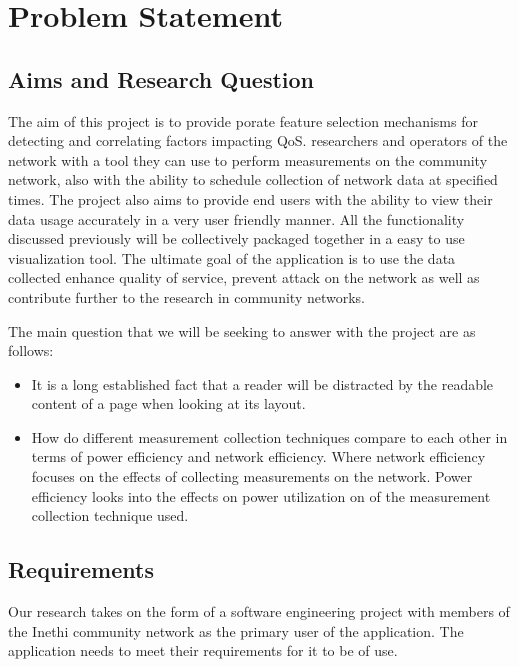 \section{Problem Statement}
\subsection{Aims and Research Question}
The aim of this project is to provide porate feature selection mechanisms for detecting and correlating factors impacting QoS.
researchers and operators of the network with a tool they can use to perform measurements on the community network, also with the ability to schedule collection of network data at specified times. The project also aims to provide end users with the ability to view their data usage accurately in a very user friendly manner. All the functionality discussed previously will be collectively packaged together in a easy to use visualization tool. The ultimate goal of the application is to use the data collected enhance quality of service, prevent attack on the network as well as contribute further to the research in community networks.

The main question that we will be seeking to answer with the project are as follows:
\begin{itemize}
	\item It is a long established fact that a reader will be distracted by the readable content of a page when looking at its layout. 
	\item How do different measurement collection techniques compare to each other in terms of power efficiency and network efficiency. Where network efficiency focuses on the effects of collecting measurements on the network. Power efficiency looks into the effects on power utilization on of the measurement collection technique used.
\end{itemize}

\subsection{Requirements}
Our research takes on the form of a software engineering project with members of the Inethi community network as the primary user of the application. The application needs to meet their requirements for it to be of use.
